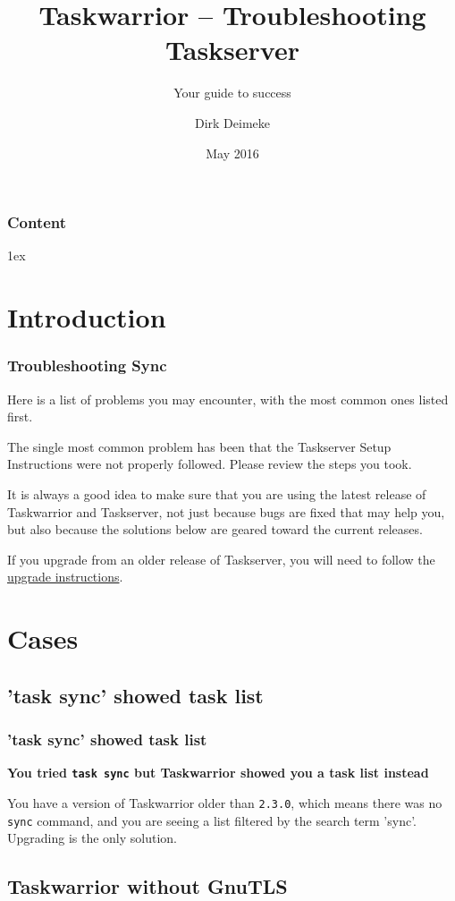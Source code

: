 \documentclass[t,handout]{beamer}
\title{Taskwarrior -- Troubleshooting Taskserver}
\subtitle{Your guide to success}
\author[Deimeke, Dirk]{Dirk Deimeke}
\institute[Taskwarrior Academy]{Taskwarrior Academy}
\date{May 2016}
\begin{document}
\begin{frame} %
	\titlepage
\end{frame}


\begin{frame}\frametitle{Content}
	\tableofcontents
\end{frame}

\parskip1ex

\section{Introduction}

\begin{frame}[fragile]\frametitle{Troubleshooting Sync}
  Here is a list of problems you may encounter, with the most common
  ones listed first.

  The single most common problem has been that the Taskserver Setup Instructions were not properly followed.  Please review the steps you took.

  It is always a good idea to make sure that you are using the latest release of Taskwarrior and Taskserver, not just because bugs are fixed that may help you, but also because the solutions below are geared toward the current releases.

  If you upgrade from an older release of Taskserver, you will need to follow the \href{http://taskwarrior.org/docs/taskserver/upgrade.html}{upgrade instructions}.
\end{frame}

\section{Cases}
\subsection{'task sync' showed task list}

\begin{frame}[fragile]\frametitle{'task sync' showed task list}
    \textbf{You tried \texttt{task sync} but Taskwarrior showed you a task list instead}

    You have a version of Taskwarrior older than \verb+2.3.0+, which means there was no \verb+sync+ command, and you are seeing a list filtered by the search term 'sync'. Upgrading is the only solution.
\end{frame}

\subsection{Taskwarrior without GnuTLS}
\end{document}
